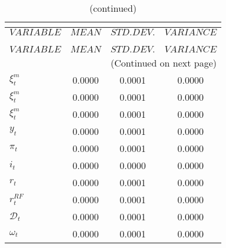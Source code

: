 
\begin{center}
\begin{longtable}{lccc} 
\caption{THEORETICAL MOMENTS}\\
 \label{Table:th_moments}\\
\toprule 
$VARIABLE       $	 & 	 $         MEAN$	 & 	 $    STD. DEV.$	 & 	 $     VARIANCE$\\
\midrule \endfirsthead 
\caption{(continued)}\\
 \toprule \\ 
$VARIABLE       $	 & 	 $         MEAN$	 & 	 $    STD. DEV.$	 & 	 $     VARIANCE$\\
\midrule \endhead 
\midrule \multicolumn{4}{r}{(Continued on next page)} \\ \bottomrule \endfoot 
\bottomrule \endlastfoot 
$\xi^m_t        $	 & 	       0.0000	 & 	       0.0001	 & 	       0.0000 \\ 
$\xi^m_t        $	 & 	       0.0000	 & 	       0.0001	 & 	       0.0000 \\ 
$\xi^m_t        $	 & 	       0.0000	 & 	       0.0001	 & 	       0.0000 \\ 
$y_t            $	 & 	       0.0000	 & 	       0.0001	 & 	       0.0000 \\ 
$\pi_t          $	 & 	       0.0000	 & 	       0.0001	 & 	       0.0000 \\ 
$i_t            $	 & 	       0.0000	 & 	       0.0000	 & 	       0.0000 \\ 
$r_t            $	 & 	       0.0000	 & 	       0.0001	 & 	       0.0000 \\ 
$r^{RF}_t       $	 & 	       0.0000	 & 	       0.0001	 & 	       0.0000 \\ 
$\mathcal{D}_t  $	 & 	       0.0000	 & 	       0.0001	 & 	       0.0000 \\ 
$\omega_t       $	 & 	       0.0000	 & 	       0.0001	 & 	       0.0000 \\ 
\end{longtable}
 \end{center}

